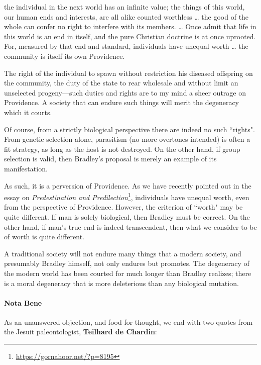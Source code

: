\begin{quotex}
 the individual in the next world has an infinite value; the things of this world, our human ends and interests, are all alike counted worthless … the good of the whole can confer no right to interfere with its members. … Once admit that life in this world is an end in itself, and the pure Christian doctrine is at once uprooted. For, measured by that end and standard, individuals have unequal worth … the community is itself its own Providence.

The right of the individual to spawn without restriction his diseased offspring on the community, the duty of the state to rear wholesale and without limit an unselected progeny—such duties and rights are to my mind a sheer outrage on Providence. A society that can endure such things will merit the degeneracy which it courts. 

\end{quotex}
Of course, from a strictly biological perspective there are indeed no such ``rights". From genetic selection alone, parasitism (no more overtones intended) is often a fit strategy, as long as the host is not destroyed. On the other hand, if group selection is valid, then Bradley's proposal is merely an example of its manifestation.

As such, it is a perversion of Providence. As we have recently pointed out in the essay on \textit{Predestination and Predilection}\footnote{\url{https://gornahoor.net/?p=8195}}, individuals have unequal worth, even from the perspective of Providence. However, the criterion of ``worth" may be quite different. If man is solely biological, then Bradley must be correct. On the other hand, if man's true end is indeed transcendent, then what we consider to be of worth is quite different.

A traditional society will not endure many things that a modern society, and presumably Bradley himself, not only endures but promotes. The degeneracy of the modern world has been courted for much longer than Bradley realizes; there is a moral degeneracy that is more deleterious than any biological mutation.

\paragraph{Nota Bene}
As an unanswered objection, and food for thought, we end with two quotes from the Jesuit paleontologist, \textbf{Teilhard de Chardin}:

